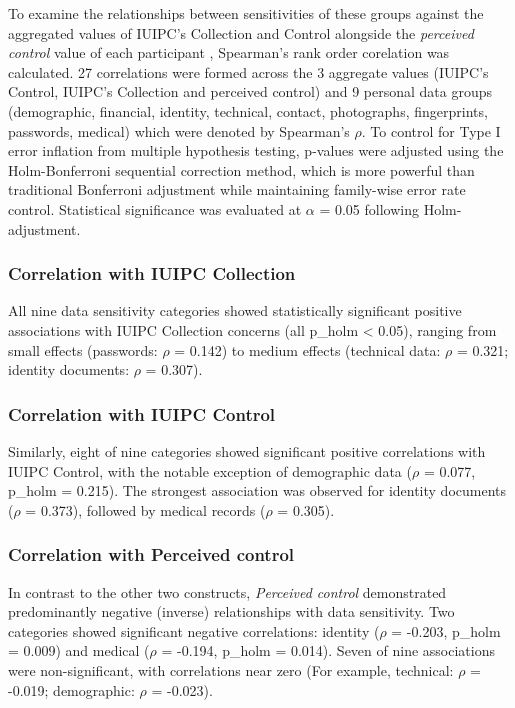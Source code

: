 To examine the relationships between sensitivities of these groups against the aggregated values of IUIPC's Collection and Control alongside the \textit{perceived control} value of each participant , Spearman's rank order corelation \cite{spearman1904} was calculated. 27 correlations were formed across the 3 aggregate values (IUIPC's Control, IUIPC's Collection and perceived control) and 9 personal data groups (demographic, financial, identity, technical, contact, photographs, fingerprints, passwords, medical) which were denoted by Spearman's $\rho$. To control for Type I error inflation from multiple hypothesis testing, p-values were adjusted using the Holm-Bonferroni sequential correction method, which is more powerful than traditional Bonferroni adjustment while maintaining family-wise error rate control. Statistical significance was evaluated at $\alpha$ = 0.05 following Holm-adjustment.

\subsubsection{Correlation with IUIPC Collection}
All nine data sensitivity categories showed statistically significant positive associations with IUIPC Collection concerns (all p\_holm < 0.05), ranging from small effects (passwords: $\rho$ = 0.142) to medium effects (technical data: $\rho$ = 0.321; identity documents: $\rho$ = 0.307).

\subsubsection{Correlation with IUIPC Control}

Similarly, eight of nine categories showed significant positive correlations with IUIPC Control, with the notable exception of demographic data ($\rho$ = 0.077, p\_holm = 0.215). The strongest association was observed for identity documents ($\rho$ = 0.373), followed by medical records ($\rho$ = 0.305).

\subsubsection{Correlation with Perceived control}

In contrast to the other two constructs, \textit{Perceived control} demonstrated predominantly negative (inverse) relationships with data sensitivity. Two categories showed significant negative correlations: identity ($\rho$ = -0.203, p\_holm = 0.009) and medical ($\rho$ = -0.194, p\_holm = 0.014). Seven of nine associations were non-significant, with correlations near zero (For example, technical: $\rho$ = -0.019; demographic: $\rho$ = -0.023). 

